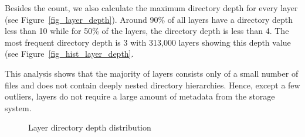 
Besides the count, we also calculate the maximum directory depth for every layer
(see Figure~\ref{fig_layer_depth}).
%
Around 90\% of all layers have a directory depth less than 10
while for 50\%  of the layers, the directory depth is less than 4. 
%
The most frequent directory depth is 3 with 313,000 layers showing
this depth value (see Figure~\ref{fig_hist_layer_depth}.
%
%

This analysis shows that the majority of layers consists only of a small number
of files and does not contain deeply nested directory hierarchies. Hence, except
a few outliers, layers do not require a large amount of metadata from the storage
system.

\begin{figure}[!t]
	\centering
	\caption{Layer directory depth distribution}
	\label{fig-layer-dir}
\end{figure}
